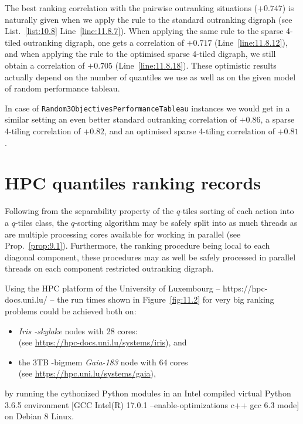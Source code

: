 The best ranking correlation with the pairwise outranking situations ($+0.747$) is naturally given when we apply the \Copeland rule to the standard outranking digraph (see List.~\vref{list:10.8} Line~\ref{line:11.8.7}). When applying the same rule to the sparse 4-tiled outranking digraph, one gets a correlation of $+0.717$ (Line~\ref{line:11.8.12}), and when applying the \Copeland rule to the optimised sparse 4-tiled digraph, we still obtain a correlation of $+0.705$ (Line~\ref{line:11.8.18}). These optimistic results actually depend on the number of quantiles we use as well as on the given model of random performance tableau.

In case of \texttt{Random3ObjectivesPerformanceTableau} instances we would get in a similar setting an even better standard outranking correlation of $+0.86$, a sparse 4-tiling correlation of $+0.82$, and an optimised sparse 4-tiling correlation of $+0.81$.

\section{HPC quantiles ranking records}
\label{sec:11.6}

Following from the separability property of the $q$-tiles sorting of each action into a $q$-tiles class, the $q$-sorting algorithm may be safely split into as much threads as are multiple processing cores available for working in parallel (see Prop.~\ref{prop:9.1}). Furthermore, the ranking procedure being local to each diagonal component, these procedures may as well be safely processed in parallel threads on each component restricted outranking digraph.

Using the HPC platform of the University of Luxembourg -- https://hpc-docs.uni.lu/ \citep{UNI-2014}-- the run times shown in Figure~\vref{fig:11.2} for very big ranking problems could be achieved both on:
\begin{itemize}[topsep=2pt]
\item \emph{Iris -skylake} nodes with 28 cores:\\
  (see \href{https://hpc-docs.uni.lu/systems/iris/}{https://hpc-docs.uni.lu/systems/iris}), and
\item the 3TB -bigmem \emph{Gaia-183} node with 64 cores \\
  (see \href{https://hpc.uni.lu/systems/gaia/}{https://hpc.uni.lu/systems/gaia}),
\end{itemize}
by running the cythonized Python modules in an Intel compiled virtual Python 3.6.5 environment [GCC Intel(R) 17.0.1 –enable-optimizations c++ gcc 6.3 mode] on Debian 8 Linux.

